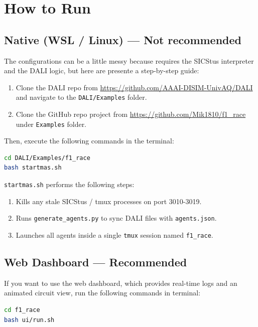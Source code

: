 \section{How to Run}

\subsection{Native (WSL / Linux) --- Not recommended}
The configurations can be a little messy because requires the SICStus interpreter and the DALI logic, but here are presente a step-by-step guide:
\begin{enumerate}
  \item Clone the DALI repo from \url{https://github.com/AAAI-DISIM-UnivAQ/DALI} and navigate to the \texttt{DALI/Examples} folder.
  \item Clone the GitHub repo project from \url{https://github.com/Mik1810/f1_race} under \texttt{Examples} folder.
\end{enumerate}
Then, execute the following commands in the terminal:\\

\begin{lstlisting}[language=bash, numbers=none]
cd DALI/Examples/f1_race
bash startmas.sh
\end{lstlisting}

\texttt{startmas.sh} performs the following steps:
\begin{enumerate}[leftmargin=2em]
  \item Kills any stale SICStus / tmux processes on port 3010-3019.
  \item Runs \texttt{generate\_agents.py} to sync DALI files with \texttt{agents.json}.
  \item Launches all agents inside a single \texttt{tmux}
        session named \texttt{f1\_race}.
\end{enumerate}

\subsection{Web Dashboard --- Recommended}

If you want to use the web dashboard, which provides real-time 
logs and an animated circuit view, run the following commands
 in terminal:\\

\begin{lstlisting}[language=bash, numbers=none]
cd f1_race
bash ui/run.sh
\end{lstlisting}

